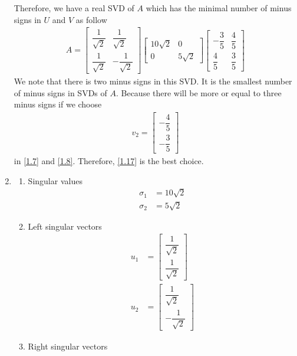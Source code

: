 \documentclass[a4paper,oneside]{book}
\numberwithin{equation}{chapter}
\begin{document}
\begin{enumerate}
Therefore, we have a real SVD of $A$ which has the minimal number of minus signs in $U$ and $V$ as follow
\begin{align}
\label{1.17}
A = \left[ {\begin{array}{*{20}{c}}
{\dfrac{1}{{\sqrt 2 }}}&{  \dfrac{1}{{\sqrt 2 }}}\\
{\dfrac{1}{{\sqrt 2 }}}&{ -\dfrac{1}{{\sqrt 2 }}}
\end{array}} \right]\left[ {\begin{array}{*{20}{c}}
{10 \sqrt 2}&0\\
0&{5 \sqrt 2}
\end{array}} \right]\left[ {\begin{array}{*{20}{c}}
{ - \dfrac{3}{5}}&{\dfrac{4}{5}}\\
{\dfrac{4}{5}}&{\dfrac{3}{5}}
\end{array}} \right]
\end{align}
We note that there is two minus signs in this SVD. It is the smallest number of minus signs in SVDs of $A$. Because there will be more or equal to three minus signs if we choose 
\begin{align}
{v_2} = \left[ {\begin{array}{*{20}{c}}
{ - \dfrac{4}{5}}\\
{ - \dfrac{3}{5}}
\end{array}} \right]
\end{align}
in \eqref{1.7} and \eqref{1.8}. Therefore, \eqref{1.17} is the best choice.
\item 
\begin{enumerate}
\item Singular values
\begin{align}
{\sigma _1} &= 10\sqrt 2 \\
{\sigma _2} &= 5\sqrt 2 
\end{align}
\item Left singular vectors
\begin{align}
{u_1} &= \left[ {\begin{array}{*{20}{c}}
{\dfrac{1}{{\sqrt 2 }}}\\
{\dfrac{1}{{\sqrt 2 }}}
\end{array}} \right]\\
{u_2} &= \left[ {\begin{array}{*{20}{c}}
{ \dfrac{1}{{\sqrt 2 }}}\\
{-\dfrac{1}{{\sqrt 2 }}}
\end{array}} \right]
\end{align}
\item Right singular vectors

\end{enumerate}
\end{enumerate}
\end{document}
